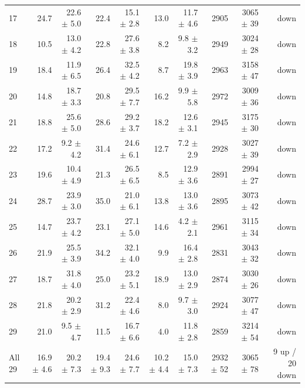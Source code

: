 \begin{tabular}{lrrrrrrrrr}
17 & 24.7 & 22.6 $\pm$ 5.0 & 22.4 & 15.1 $\pm$ 2.8 & 13.0 & 11.7 $\pm$ 4.6 & 2905 & 3065 $\pm$ 39 & down \\
18 & 10.5 & 13.0 $\pm$ 4.2 & 22.8 & 27.6 $\pm$ 3.8 & 8.2 & 9.8 $\pm$ 3.2 & 2949 & 3024 $\pm$ 28 & down \\
19 & 18.4 & 11.9 $\pm$ 6.5 & 26.4 & 32.5 $\pm$ 4.2 & 8.7 & 19.8 $\pm$ 3.9 & 2963 & 3158 $\pm$ 47 & down \\
20 & 14.8 & 18.7 $\pm$ 3.3 & 20.8 & 29.5 $\pm$ 7.7 & 16.2 & 9.9 $\pm$ 5.8 & 2972 & 3009 $\pm$ 36 & down \\
21 & 18.8 & 25.6 $\pm$ 5.0 & 28.6 & 29.2 $\pm$ 3.7 & 18.2 & 12.6 $\pm$ 3.1 & 2945 & 3175 $\pm$ 30 & down \\
22 & 17.2 & 9.2 $\pm$ 4.2 & 31.4 & 24.6 $\pm$ 6.1 & 12.7 & 7.2 $\pm$ 2.9 & 2928 & 3027 $\pm$ 39 & down \\
23 & 19.6 & 10.4 $\pm$ 4.9 & 21.3 & 26.5 $\pm$ 6.5 & 8.5 & 12.9 $\pm$ 3.6 & 2891 & 2994 $\pm$ 27 & down \\
24 & 28.7 & 23.9 $\pm$ 3.0 & 35.0 & 21.0 $\pm$ 6.1 & 13.8 & 13.0 $\pm$ 3.6 & 2895 & 3073 $\pm$ 42 & down \\
25 & 14.7 & 23.7 $\pm$ 4.2 & 23.1 & 27.1 $\pm$ 5.0 & 14.6 & 4.2 $\pm$ 2.1 & 2961 & 3115 $\pm$ 34 & down \\
26 & 21.9 & 25.5 $\pm$ 3.9 & 34.2 & 32.1 $\pm$ 4.0 & 9.9 & 16.4 $\pm$ 2.8 & 2831 & 3043 $\pm$ 32 & down \\
27 & 18.7 & 31.8 $\pm$ 4.0 & 25.0 & 23.2 $\pm$ 5.1 & 18.9 & 13.0 $\pm$ 2.9 & 2874 & 3030 $\pm$ 26 & down \\
28 & 21.8 & 20.2 $\pm$ 2.9 & 31.2 & 22.4 $\pm$ 4.6 & 8.0 & 9.7 $\pm$ 3.0 & 2924 & 3077 $\pm$ 47 & down \\
29 & 21.0 & 9.5 $\pm$ 4.7 & 11.5 & 16.7 $\pm$ 6.6 & 4.0 & 11.8 $\pm$ 2.8 & 2859 & 3214 $\pm$ 54 & down \\
\midrule
All 29 & 16.9 $\pm$ 4.6 & 20.2 $\pm$ 7.3 & 19.4 $\pm$ 9.3 & 24.6 $\pm$ 7.7 & 10.2 $\pm$ 4.4 & 15.0 $\pm$ 7.3 & 2932 $\pm$ 52 & 3065 $\pm$ 78 & 9 up / 20 down \\
\bottomrule
\end{tabular}
